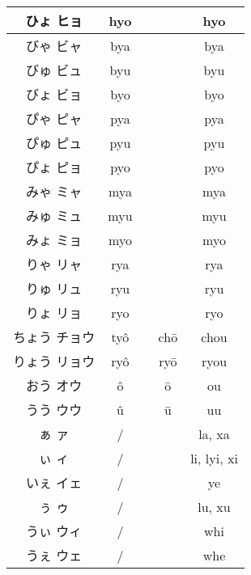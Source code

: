 \documentclass{article}
\begin{document}
\begin{center}
\begin{japanese}
\begin{longtable}{|c|c c c|c|}
                ひょ ヒョ & hyo &&& hyo \\ \hline
                びゃ ビャ & bya &&& bya \\ \hline
                びゅ ビュ & byu &&& byu \\ \hline
                びょ ビョ & byo &&& byo \\ \hline
                ぴゃ ピャ & pya &&& pya \\ \hline
                ぴゅ ピュ & pyu &&& pyu \\ \hline
                ぴょ ピョ & pyo &&& pyo \\ \hline
                みゃ ミャ & mya &&& mya \\ \hline
                みゅ ミュ & myu &&& myu \\ \hline
                みょ ミョ & myo &&& myo \\ \hline
                りゃ リャ & rya &&& rya \\ \hline
                りゅ リュ & ryu &&& ryu \\ \hline
                りょ リョ & ryo &&& ryo \\ \hline
                ちょう チョウ & tyô && \multicolumn{1}{|c|}{chō} & chou \\ \hline
                りょう リョウ & ryô && \multicolumn{1}{|c|}{ryō} & ryou \\ \hline
                おう オウ & ô && \multicolumn{1}{|c|}{ō} & ou \\ \hline
                うう ウウ & û && \multicolumn{1}{|c|}{ū} & uu \\ \hline
                ぁ ァ & / &&& la, xa \\ \hline
                ぃ ィ & / &&& li, lyi, xi \\ \hline
                いぇ イェ & / &&& ye \\ \hline
                ぅ ゥ & / &&& lu, xu \\ \hline
                うぃ ウィ & / &&& whi \\ \hline
                うぇ ウェ & / &&& whe \\ \hline

\end{longtable}
\end{japanese}
\end{center}
\end{document}
